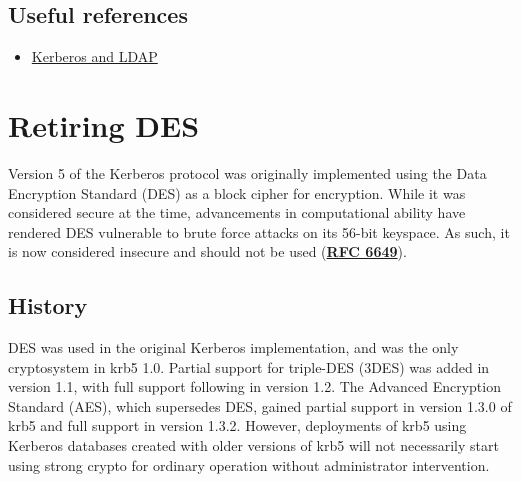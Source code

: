 \documentclass[letterpaper,10pt,english]{sphinxmanual}
\begin{document}
\subsection{Useful references}
\label{admin/advanced/ldapbackend:useful-references}\begin{itemize}
\item {} 
\href{https://help.ubuntu.com/10.04/serverguide/C/kerberos-ldap.html}{Kerberos and LDAP}

\end{itemize}


\section{Retiring DES}
\label{admin/advanced/retiring-des:retiring-des}\label{admin/advanced/retiring-des::doc}\label{admin/advanced/retiring-des:id1}
Version 5 of the Kerberos protocol was originally implemented using
the Data Encryption Standard (DES) as a block cipher for encryption.
While it was considered secure at the time, advancements in computational
ability have rendered DES vulnerable to brute force attacks on its 56-bit
keyspace.  As such, it is now considered insecure and should not be
used (\href{http://tools.ietf.org/html/rfc6649.html}{\textbf{RFC 6649}}).


\subsection{History}
\label{admin/advanced/retiring-des:history}
DES was used in the original Kerberos implementation, and was the
only cryptosystem in krb5 1.0.  Partial support for triple-DES (3DES) was
added in version 1.1, with full support following in version 1.2.
The Advanced Encryption Standard (AES), which supersedes DES, gained
partial support in version 1.3.0 of krb5 and full support in version 1.3.2.
However, deployments of krb5 using Kerberos databases created with older
versions of krb5 will not necessarily start using strong crypto for
ordinary operation without administrator intervention.
\end{document}

